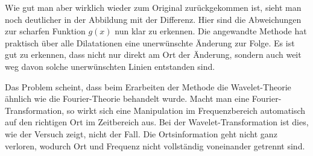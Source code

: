 Wie gut man aber wirklich wieder zum Original zurückgekommen ist, sieht man noch deutlicher in der Abbildung mit der Differenz.
Hier sind die Abweichungen zur  scharfen Funktion $g(x)$ nun klar zu erkennen.
Die angewandte Methode hat praktisch über alle Dilatationen eine unerwünschte Änderung zur Folge.
Es ist gut zu erkennen, dass nicht nur direkt am Ort der Änderung, sondern auch \glqq weit \grqq{} weg davon solche unerwünschten Linien entstanden sind.

Das Problem scheint, dass beim Erarbeiten der Methode die Wavelet-Theorie ähnlich wie die Fourier-Theorie behandelt wurde.
Macht man eine Fourier-Transformation, so wirkt sich eine Manipulation im Frequenzbereich automatisch auf den richtigen Ort im Zeitbereich aus.
Bei der Wavelet-Transformation ist dies, wie der Versuch zeigt, nicht der Fall.
Die Ortsinformation geht nicht ganz verloren, wodurch Ort und Frequenz nicht vollständig voneinander getrennt sind.
